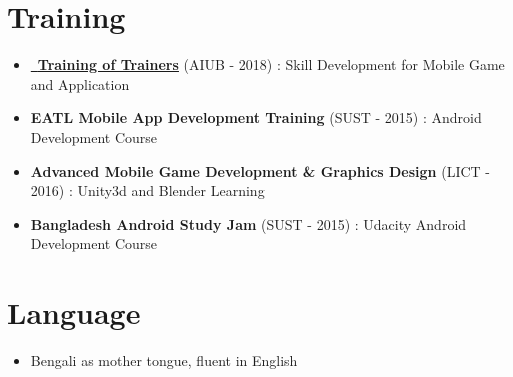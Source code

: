 \documentclass[letterpaper,11pt]{article}
\newcommand{\resumeItem}[1]{
  \item\small{
    {#1 \vspace{-2pt}}
  }
}
\newcommand{\resumeItemListStart}{\begin{itemize}}
\newcommand{\resumeItemListEnd}{\end{itemize}\vspace{-5pt}}
\begin{document}
\section{Training}
  \resumeItemListStart
    \resumeItem
      {\href{https://gameapp.gov.bd/}{\raisebox{-0.2\height}\ \underline{\textbf{Training of Trainers}}} (AIUB - 2018) :
      {Skill Development for Mobile Game and Application}}
        \resumeItem
        {\textbf{EATL Mobile App Development Training} (SUST - 2015) : {Android Development Course}}
        \resumeItem
      {\textbf{Advanced Mobile Game Development \& Graphics Design} (LICT - 2016) :
      {Unity3d and Blender Learning}}
        \resumeItem
      {\textbf{Bangladesh Android Study Jam} (SUST - 2015) :
      {Udacity Android Development Course}}
  \resumeItemListEnd
\vspace{-10pt}

\section{Language}
  \resumeItemListStart
    \resumeItem
      {Bengali as mother tongue, fluent in English}
  \resumeItemListEnd
  
\end{document}
